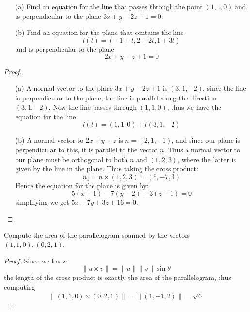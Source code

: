\documentclass[openany]{book}
\begin{document}
\begin{prob}
    \begin{enumerate}
        \item[(a)] Find an equation for the line that passes through the point $(1,1,0)$ and is perpendicular to the plane $3x+y-2z+1=0$.
        \item[(b)] Find an equation for the plane that contains the line 
        \begin{equation*}
            l(t)=(-1+t, 2+2t, 1+3t)
        \end{equation*}
        and is perpendicular to the plane 
        \begin{equation*}
            2x+y-z+1=0
        \end{equation*}
    \end{enumerate}
\end{prob}
\begin{proof}
    \begin{enumerate}
        \item[(a)] A normal vector to the plane $3x+y-2z+1$ is $(3,1,-2)$, since the line is perpendicular to the plane, the line is parallel along the direction $(3,1,-2)$. Now the line passes through $(1,1,0)$, thus we have the equation for the line 
        \begin{equation*}
            l(t)=(1,1,0)+t(3,1,-2)
        \end{equation*}
        \item[(b)] A normal vector to $2x+y-z$ is $n=(2,1,-1)$, and since our plane is perpendicular to this, it is parallel to the vector $n$. Thus a normal vector to our plane must be orthogonal to both $n$ and $(1,2,3)$, where the latter is given by the line in the plane. Thus taking the cross product:
        \begin{equation*}
            n_1=n\times (1,2,3)=(5,-7,3)
        \end{equation*}
        Hence the equation for the plane is given by:
        \begin{equation*}
            5(x+1)-7(y-2)+3(z-1)=0
        \end{equation*}
        simplifying we get $5x-7y+3z+16=0$.
    \end{enumerate}
\end{proof}

\begin{prob}
    Compute the area of the parallelogram spanned by the vectors $(1,1,0), (0,2,1)$.
\end{prob}
\begin{proof}
    Since we know 
    \begin{equation*}
        \|u\times v\|=\|u\|\|v\|\sin\theta
    \end{equation*}
    the length of the cross product is exactly the area of the parallelogram, thus computing
    \begin{equation*}
        \|(1,1,0)\times(0,2,1)\|=\|(1,-1,2)\|=\sqrt{6}
    \end{equation*}
\end{proof}
\end{document}
